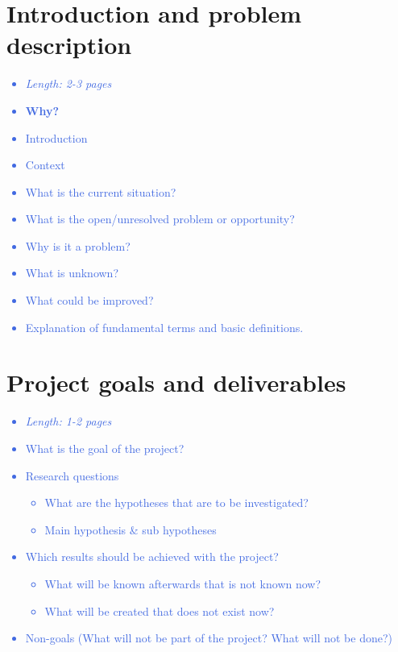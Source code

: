 \documentclass[a4paper,11pt]{article}
\providecommand*{\note}[1]{\small \textcolor{RoyalBlue}{\begin{minipage}{\textwidth}{#1}\end{minipage}}}
\begin{document}
\pagebreak

\section{Introduction and problem description}
\label{sect:intro}

\note{
\begin{itemize}
	\item {\em Length: 2-3 pages}
	\item {\bf Why?}
	\item Introduction
	\item Context
	\item What is the current situation?
	\item What is the open/unresolved problem or opportunity?
	\item Why is it a problem?
	\item What is unknown?
	\item What could be improved?
	\item Explanation of fundamental terms and basic definitions.
\end{itemize}
}

\section{Project goals and deliverables}
\label{sect:goals}

\note{
\begin{itemize}
	\item {\em Length: 1-2 pages}
	\item What is the goal of the project?
	\item Research questions
	\begin{itemize}
		\item 	    What are the hypotheses that are to be investigated?
		\item 	    Main hypothesis \& sub hypotheses
	\end{itemize}
	\item Which results should be achieved with the project?
	\begin{itemize}
	    	\item 	   What will be known afterwards that is not known now?
		\item	    What will be created that does not exist now?
	\end{itemize}
	\item Non-goals (What will not be part of the project? What will not be done?)
\end{itemize}
}
\end{document}
